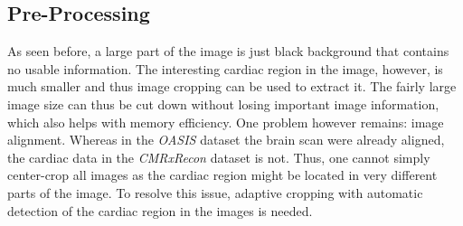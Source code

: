 \documentclass[english,version-2022-01]{uzl-thesis} %
\begin{document}


\subsection{Pre-Processing} \label{SubSec:Pre-Processing}
As seen before, a large part of the image is just black background that contains no usable information. The interesting cardiac region in the image, however, is much smaller and thus image cropping can be used to extract it. The fairly large image size can thus be cut down without losing important image information, which also helps with memory efficiency. One problem however remains: image alignment. Whereas in the \emph{OASIS} dataset the brain scan were already aligned, the cardiac data in the \emph{CMRxRecon} dataset is not. Thus, one cannot simply center-crop all images as the cardiac region might be located in very different parts of the image. To resolve this issue, adaptive cropping with automatic detection of the cardiac region in the images is needed. \\
\end{document}
